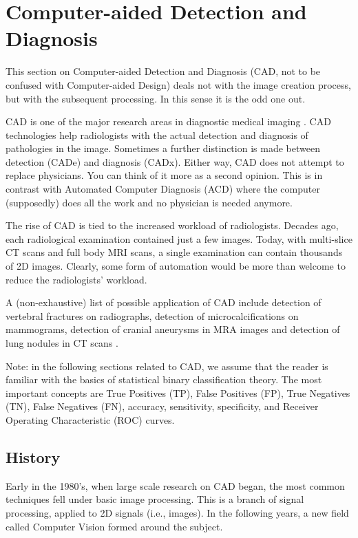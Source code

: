 \section{Computer-aided Detection and Diagnosis}
This section on Computer-aided Detection and Diagnosis (CAD, not to be
confused with Computer-aided Design) deals not with the image creation process,
but with the subsequent processing. In this sense it is the odd one out.

CAD is one of the major research areas in diagnostic medical imaging
\cite{cadhistory, suetens}. CAD technologies help radiologists with the actual
detection and diagnosis of pathologies in the image. Sometimes a further
distinction is made between detection (CADe) and diagnosis (CADx). Either way,
CAD does not attempt to replace physicians. You can think of it more as a second
opinion. This is in contrast with Automated Computer Diagnosis (ACD) where the
computer (supposedly) does all the work and no physician is needed anymore.

The rise of CAD is tied to the increased workload of radiologists. Decades ago,
each radiological examination contained just a few images. Today, with
multi-slice CT scans and full body MRI scans, a single examination can contain
thousands of 2D images. Clearly, some form of automation would be more than
welcome to reduce the radiologists' workload.

A (non-exhaustive) list of possible application of CAD include detection of
vertebral fractures on radiographs, detection of microcalcifications on
mammograms, detection of cranial aneurysms in MRA images and detection of lung
nodules in CT scans \cite{cadhistory}.

Note: in the following sections related to CAD, we assume that the reader is
familiar with the basics of statistical binary classification theory. The most
important concepts are True Positives (TP), False Positives (FP), True Negatives
(TN), False Negatives (FN), accuracy, sensitivity, specificity, and Receiver
Operating Characteristic (ROC) curves.


\subsection{History}
Early in the 1980's, when large scale research on CAD began, the most common
techniques fell under basic image processing. This is a branch of signal
processing, applied to 2D signals (i.e., images). In the following years, a new
field called Computer Vision formed around the subject. 

